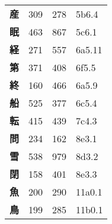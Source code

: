 \begin{longtable}[c]{llll}
    \bfseries 産 & 309 & 278 & 5b6.4\\
    \bfseries 眠 & 463 & 867 & 5c6.1\\
    \bfseries 経 & 271 & 557 & 6a5.11\\
    \bfseries 第 & 371 & 408 & 6f5.5\\
    \bfseries 終 & 160 & 466 & 6a5.9\\
    \bfseries 船 & 525 & 377 & 6c5.4\\
    \bfseries 転 & 415 & 439 & 7c4.3\\
    \bfseries 問 & 234 & 162 & 8e3.1\\
    \bfseries 雪 & 538 & 979 & 8d3.2\\
    \bfseries 閉 & 158 & 401 & 8e3.3\\
    \bfseries 魚 & 200 & 290 & 11a0.1\\
    \bfseries 鳥 & 199 & 285 & 11b0.1\\
  \end{longtable}
